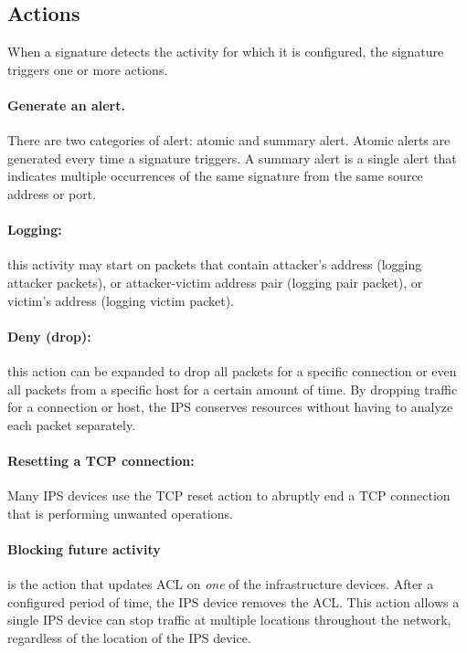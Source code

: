 \subsection{Actions}

When a signature detects the activity for which it is configured, the signature triggers one or more actions. 

\paragraph{Generate an alert.} There are two categories of alert: atomic and summary alert. Atomic alerts are generated every time a signature triggers. A summary alert is a single alert that indicates multiple occurrences of the same signature from the same source address or port. 

\paragraph{Logging:} this activity may start on packets that contain attacker's address (logging attacker packets), or attacker-victim address pair (logging pair packet), or victim's address (logging victim packet).

\paragraph{Deny (drop):} this action can be expanded to drop all packets for a specific connection or even all packets from a specific host for a certain amount of time. By dropping traffic for a connection or host, the IPS conserves resources without having to analyze each packet separately.

\paragraph{Resetting a TCP connection:} Many IPS devices use the TCP reset action to abruptly end a TCP connection that is performing unwanted operations. 

\paragraph{Blocking future activity} is the action that updates ACL on \emph{one} of the infrastructure devices. After a configured period of time, the IPS device removes the ACL. This action allows a single IPS device can stop traffic at multiple locations throughout the network, regardless of the location of the IPS device. 

